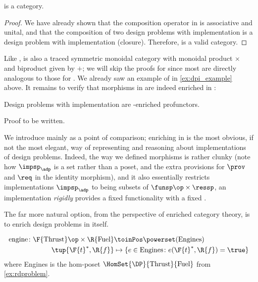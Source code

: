 {    \begin{lemma}
        \DPI is a category.
    \end{lemma}

    \begin{proof}
        We have already shown that the composition operator in \DPI is associative and unital, and that the composition of two design problems with implementation is a design problem with implementation (closure).
        Therefore, \DPI is a valid category.
    \end{proof}

    Like \DP, \DPI is also a traced symmetric monoidal category with monoidal product $\times$ and biproduct given by $+$; we will skip the proofs for \DPI since most are directly analogous to those for \DP.
    We already saw an example of \DPI in \cref{ex:dpi_example} above.
    It remains to verify that morphisms in \DPI are indeed enriched in \Set:

    \begin{proposition}
        Design problems with implementation are \Set-enriched profunctors.
    \end{proposition}
    \begin{publictodo}
        Proof to be written.
    \end{publictodo}
    We introduce \DPI mainly as a point of comparison; enriching in \Set is the most obvious, if not the most elegant, way of representing and reasoning about implementations of design problems.
    Indeed, the way we defined morphisms is rather clunky (note how $\impsp_\adp$ is a set rather than a poset, and the extra provisions for $\prov$ and $\req$ in the identity morphism), and it also essentially restricts implementations $\impsp_\adp$ to being subsets of $\funsp\op \times \ressp$, \ie  an implementation \emph{rigidly} provides a fixed functionality \fun with a fixed \res.

    The far more natural option, from the perspective of enriched category theory, is to enrich design problems in \DP itself.

    \begin{example}
        \begin{equation}
            \begin{aligned}
                \text{engine} \colon \F{\text{Thrust}}\op \times \R{\text{Fuel}} &\toinPos \powerset(\text{Engines}) \\
                \tup{\F{t}^*,\R{f}} &\mapsto \{ e \in \text{Engines} \colon e(\F{t}^*, \R{f}) = \true \}
            \end{aligned}
        \end{equation}
        where Engines is the hom-poset $\HomSet{\DP}{\text{Thrust}}{\text{Fuel}}$ from \cref{ex:rdproblem}.
    \end{example}

}
